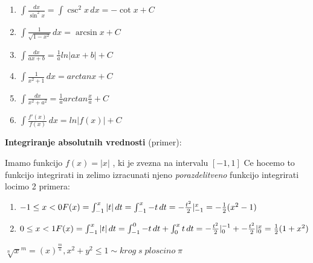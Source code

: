 \begin{center}
\begin{small}
\begin{enumerate}
            \item \begin{math}
                \int \frac{dx}{\sin^2 x}=\int \csc^2 x \, dx = -\cot x + C
            \end{math}
            \item \begin{math}
                \int {\frac{1}{\sqrt{1-x^2}}} \, dx = \arcsin {x} + C
            \end{math}
            \item \begin{math}
                \int \frac{dx}{ax + b} = \frac{1}{a} ln |ax + b| + C
            \end{math}
            \item \begin{math}
                \int \frac{1}{x^2 + 1} \, dx = arctan x + C
            \end{math}
            \item \begin{math}
                \int \frac{dx}{x^2 + a^2} = \frac{1}{a} arctan \frac{x}{a} + C
            \end{math}
            \item \begin{math}
                \int \frac{f'(x)}{f(x)} \, dx = ln|f(x)| + C
            \end{math}
        \end{enumerate}
    \end{small}
\end{center}
    \textbf{Integriranje absolutnih vrednosti} (primer):
    \begin{small}
        Imamo funkcijo $f(x) = |x|$ , ki je zvezna na intervalu $[-1, 1]$
        Ce hocemo to funkcijo integrirati in zelimo izracunati njeno 
        \textit{porazdelitveno} funkcijo integrirati locimo 2 primera:    
    \end{small}
    \begin{enumerate}
        \item \begin{math}
            -1 \leq x < 0\\
            F(x) = \int_{-1}^x |t|\,dt = \int_{-1}^x -t\,dt = - \frac{t^2}{2} \rvert_{-1}^{x} = - \frac{1}{2} (x^2 -1)
        \end{math}
        \item \begin{math}
            0 \leq x < 1 \\
            F(x) = \int_{-1}^x |t|\,dt = \int_{-1}^0 -t\,dt + \int_{0}^x t\,dt = - \frac{t^2}{2} \rvert_{0}^{-1} + - \frac{t^2}{2} \rvert_{0}^{x}= \frac{1}{2} (1 + x^2)
        \end{math}
    \end{enumerate}
\begin{small}
    \begin{math}
        \sqrt[n] x^m = (x)^{\frac{m}{n}}, x^2 + y^2 \leq 1 \sim krog\; s\; ploscino\; \pi
    \end{math}
\end{small}
